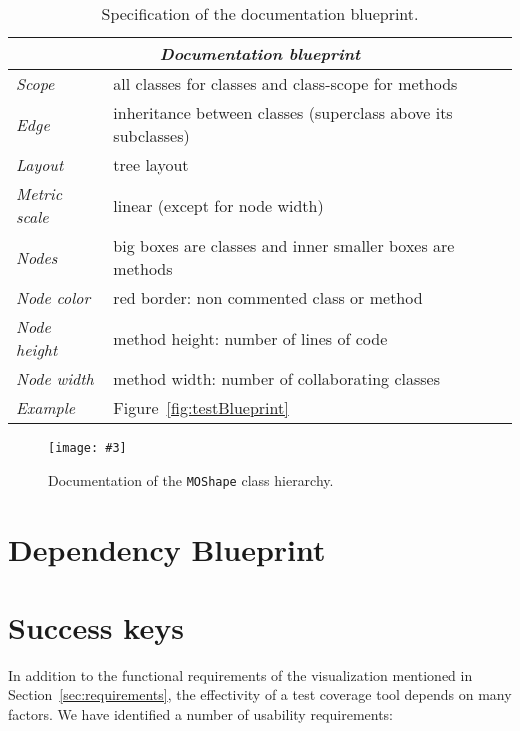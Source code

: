 \documentclass[runningheads]{llncs}
\newcommand{\ct}{\lstinline[backgroundcolor=\color{white},basicstyle=\footnotesize\ttfamily]}
\newcommand{\largefig}[4]{
	\begin{figure*}[#1]
		\centering
		\texttt{[image: \#3]}
		\caption{\label{fig:#3}#4}
	\end{figure*}}
\newcommand{\figref}[1]{Figure~\ref{fig:#1}}
\newcommand{\secref}[1]{Section~\ref{sec:#1}}
\newcommand{\tablabel}[1]{\label{tab:#1}}
\begin{document}
\begin{table}
\begin{center}
\begin{tabular}{|l|p{6cm}|}\hline
\multicolumn{2}{|c|}{\emph{\textbf{Documentation blueprint}}}\\\hline\hline

\emph{Scope}		& all classes for classes and class-scope for methods \\\hline 
\hline
\emph{Edge}		& inheritance between classes (superclass above its subclasses)\\ 
\emph{Layout}		& tree layout\\ 
\emph{Metric scale}	& linear (except for node width)\\
\emph{Nodes}		& big boxes are classes and inner smaller boxes are methods\\ \hline
\hline
\emph{Node color}	& red border: non commented class or method\\
\emph{Node height}	& method height: number of lines of code \\
\emph{Node width}	& method width: number of collaborating classes\\\hline 
\hline
\emph{Example} 	   & \figref{testBlueprint}\\\hline

\end{tabular}
\end{center}
\caption{Specification of the documentation blueprint.} \tablabel{documentationBlueprint}
\end{table}

\largefig{}{1.0}{MOShapeDocumentationBlueprintEvolution}{Documentation of the \ct{MOShape} class hierarchy.}

\section{Dependency Blueprint}


\section{Success keys}

In addition to the functional requirements of the visualization mentioned in \secref{requirements}, the effectivity of a test coverage tool depends on many factors. We have identified a number of usability requirements:
\end{document}
